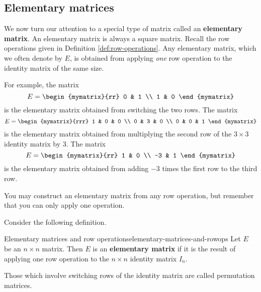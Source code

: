 
\subsection{Elementary matrices}

We now turn our attention to a special type of matrix called an \textbf{elementary matrix}. 
An elementary matrix is always a square matrix. Recall the row operations given in Definition \ref{def:row-operations}.
Any elementary matrix, which we often denote by $E$, is obtained from applying
{\em one\em} row operation to the identity matrix of the same size. 

For example, the matrix
\begin{equation*}
E = 
\begin{mymatrix}{rr}
0 & 1 \\
1 & 0
\end{mymatrix}
\end{equation*}
is the elementary matrix obtained from switching the two rows. 
The matrix 
\begin{equation*}
E = 
\begin{mymatrix}{rrr}
1 & 0 & 0 \\
0 & 3 & 0 \\
0 & 0 & 1
\end{mymatrix}
\end{equation*}
is the elementary matrix obtained from multiplying the second row of the $3 \times 3$ identity matrix
by $3$.
The matrix
\begin{equation*}
E = 
\begin{mymatrix}{rr}
1 & 0 \\
-3 & 1
\end{mymatrix}
\end{equation*}
is the elementary matrix obtained from adding $-3$ times the first row to the third row.

You may construct an elementary matrix from any row operation, but remember that you can only apply one operation.

Consider the following definition. 

\begin{definition}{Elementary matrices and row operations}{elementary-matrices-and-rowops}
Let $E$ be an $n \times n$ matrix. Then $E$ is an \textbf{elementary matrix} 
if it is the result of applying one row operation to the $n \times n$ identity matrix $I_n$. 

Those which involve switching rows of the identity matrix are called
permutation matrices.
\end{definition}

